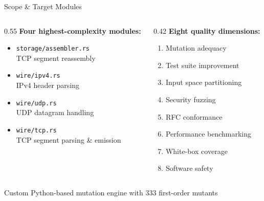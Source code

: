 \documentclass[aspectratio=169,11pt]{beamer}
\begin{document}
\begin{frame}{Scope \& Target Modules}
\begin{columns}[T]
\begin{column}{0.55\textwidth}
  \textbf{Four highest-complexity modules:}
  \vspace{0.2cm}
  \begin{itemize}
    \item \texttt{storage/assembler.rs}\\{\small TCP segment reassembly}
    \item \texttt{wire/ipv4.rs}\\{\small IPv4 header parsing}
    \item \texttt{wire/udp.rs}\\{\small UDP datagram handling}
    \item \texttt{wire/tcp.rs}\\{\small TCP segment parsing \& emission}
  \end{itemize}
\end{column}
\begin{column}{0.42\textwidth}
  \textbf{Eight quality dimensions:}
  \vspace{0.2cm}
  \begin{enumerate}\small
    \item Mutation adequacy
    \item Test suite improvement
    \item Input space partitioning
    \item Security fuzzing
    \item RFC conformance
    \item Performance benchmarking
    \item White-box coverage
    \item Software safety
  \end{enumerate}
\end{column}
\end{columns}
\vspace{0.2cm}
\textcolor{subtletext}{\small Custom Python-based mutation engine with 333 first-order mutants}
\end{frame}
\end{document}
